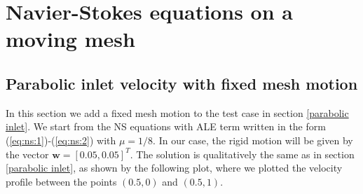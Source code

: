 \documentclass[a4paper,11pt,openright,twoside]{book}
\begin{document}
%
%
%
%

\newpage

\section{Navier-Stokes equations on a moving mesh}
\subsection{Parabolic inlet velocity with fixed mesh motion}
In this section we add a fixed mesh motion to the test case in section \ref{parabolic inlet}. We start from the NS equations with ALE term written in the form (\ref{eq:ns:1})-(\ref{eq:ns:2}) with $\mu = 1/8$. In our case, the rigid motion will be given by the vector $\mathbf{w} = [0.05, 0.05]^T$. The solution is qualitatively the same as in section \ref{parabolic inlet}, as shown by the following plot, where we plotted the velocity profile between the points $(0.5, 0)$ and $(0.5, 1)$.
\end{document}

